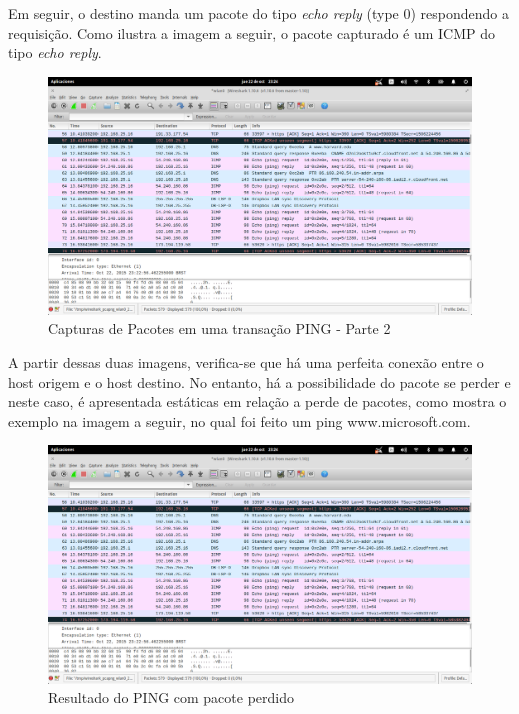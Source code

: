 Em seguir, o destino manda um pacote do tipo \emph{echo reply} (type 0) respondendo a requisição. Como ilustra a imagem a seguir, o pacote capturado é um ICMP do tipo \emph{echo reply}.


  \begin{figure}[h]
    \centering

    \includegraphics[width=450px, scale=1]{figuras/ping}
    \caption{Capturas de Pacotes em uma transação PING - Parte 2}

 \label{fig:3}
  \end{figure}

A partir dessas duas imagens, verifica-se que há uma perfeita conexão entre o host origem e o host destino. No entanto, há a possibilidade do pacote se perder e neste caso, é apresentada estáticas em relação a perde de pacotes, como mostra o exemplo na imagem a seguir, no qual foi feito um ping www.microsoft.com.

 \begin{figure}[h]
    \centering

    \includegraphics[width=450px, scale=1]{figuras/ping}
    \caption{Resultado do PING com pacote perdido}

 \label{fig:4}
  \end{figure}

